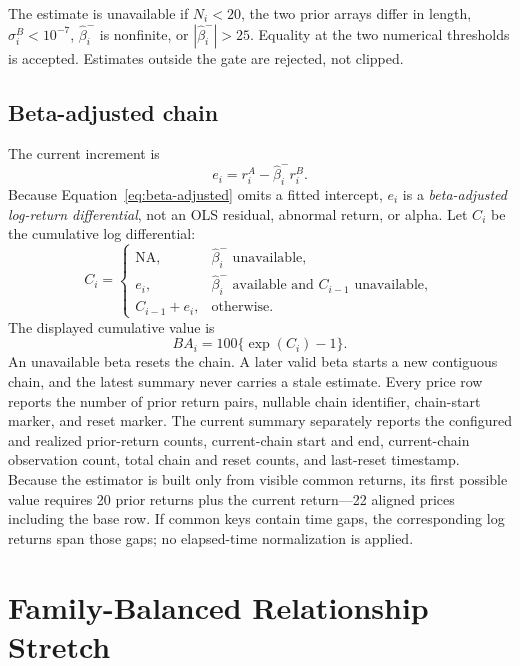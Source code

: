 \documentclass{article}
\newcommand{\NA}{\mathrm{NA}}
\begin{document}
The estimate is unavailable if $N_i<20$, the two prior arrays differ in length, $\sigma^B_i<10^{-7}$, $\widehat\beta^-_i$ is nonfinite, or $|\widehat\beta^-_i|>25$. Equality at the two numerical thresholds is accepted. Estimates outside the gate are rejected, not clipped.

\subsection{Beta-adjusted chain}

The current increment is
\begin{equation}
e_i=r^A_i-\widehat\beta^-_i r^B_i.
\label{eq:beta-adjusted}
\end{equation}
Because Equation~\ref{eq:beta-adjusted} omits a fitted intercept, $e_i$ is a \emph{beta-adjusted log-return differential}, not an OLS residual, abnormal return, or alpha. Let $C_i$ be the cumulative log differential:
\begin{equation}
C_i=
\begin{cases}
\NA, & \widehat\beta^-_i\text{ unavailable},\\
e_i, & \widehat\beta^-_i\text{ available and }C_{i-1}\text{ unavailable},\\
C_{i-1}+e_i, & \text{otherwise}.
\end{cases}
\label{eq:chain}
\end{equation}
The displayed cumulative value is
\begin{equation}
BA_i=100\{\exp(C_i)-1\}.
\label{eq:ba}
\end{equation}
An unavailable beta resets the chain. A later valid beta starts a new contiguous chain, and the latest summary never carries a stale estimate. Every price row reports the number of prior return pairs, nullable chain identifier, chain-start marker, and reset marker. The current summary separately reports the configured and realized prior-return counts, current-chain start and end, current-chain observation count, total chain and reset counts, and last-reset timestamp. Because the estimator is built only from visible common returns, its first possible value requires 20 prior returns plus the current return---22 aligned prices including the base row. If common keys contain time gaps, the corresponding log returns span those gaps; no elapsed-time normalization is applied.

\section{Family-Balanced Relationship Stretch}
\end{document}
